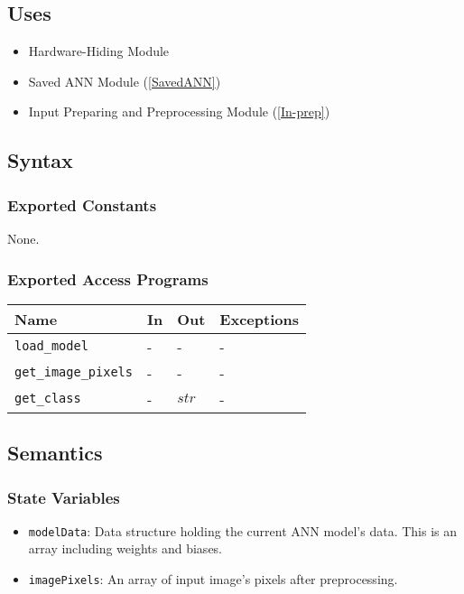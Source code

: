 \documentclass[12pt, titlepage]{article}
\def\code#1{\texttt{#1}}
\begin{document}
\subsection{Uses}
\begin{itemize}
  \item Hardware-Hiding Module  
  \item Saved ANN Module (\ref{SavedANN})
  \item Input Preparing and Preprocessing Module (\ref{In-prep})
\end{itemize}


\subsection{Syntax}

\subsubsection{Exported Constants}
None.

\subsubsection{Exported Access Programs}

\begin{center}
\begin{tabular}{p{3cm} p{4cm} p{4cm} p{2cm}}
\hline
\textbf{Name} & \textbf{In} & \textbf{Out} & \textbf{Exceptions} \\
\hline
\code{load\_model} & - & - & - \\
\code{get\_image\_pixels} & - & - & - \\
\code{get\_class} & - & $str$&  -\\
\hline
\end{tabular}
\end{center}

\subsection{Semantics}

\subsubsection{State Variables}
\begin{itemize}
  \item \code{modelData}: Data structure holding the current ANN model's data. 
  This is an array including weights and biases.
  \item \code{imagePixels}: An array of input image's pixels after preprocessing.
\end{itemize}
\end{document}
